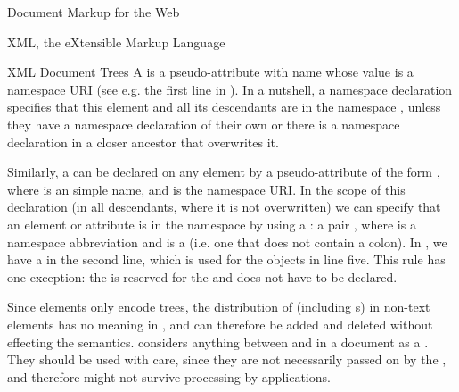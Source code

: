 \begin{omgroup}[id=markup-web]{Document Markup for the Web}
\begin{omgroup}[id=xml]{XML, the eXtensible Markup Language}
\begin{omgroup}[id=xml-tree]{XML Document Trees}
A {} is a pseudo-attribute with name {}
whose value is a namespace URI {} (see e.g. the first line in
{}). In a nutshell, a namespace declaration specifies that this element
and all its descendants are in the namespace {}, unless they have a
namespace declaration of their own or there is a namespace declaration in a closer
ancestor that overwrites it.

Similarly, a {} can be declared on any element by a
pseudo-attribute of the form
{}, where
{} is an {\xml} simple name, and {} is the namespace URI.  In
the scope of this declaration (in all descendants, where it is not overwritten) we can
specify that an element or attribute is in the namespace {} by using a
{}: a pair {\snippet{:}}, where
{} is a namespace abbreviation and {} is a
{} (i.e. one that does not contain a colon). In
{}, we have a {} in the second line,
which is used for the {\openmath} objects in line five. This rule has one exception: the
{} {} is reserved for the {} and does not have to be declared.

Since {\xml} elements only encode trees, the distribution of {}
(including {s}) in non-text elements has no meaning in {\xml}, and can
therefore be added and deleted without effecting the semantics.  {\xml} considers anything
between {} and {\snippetin{-->}} in a document as a
{}.  They should be used with care, since they are not
necessarily passed on by the {}, and therefore might
not survive processing by {\xml} applications.


\end{omgroup}
\end{omgroup}
\end{omgroup}
